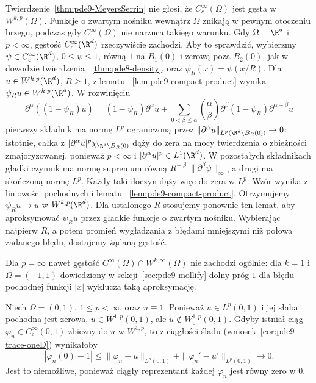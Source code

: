 \begin{uwaga}
Twierdzenie~\ref{thm:pde9-MeyersSerrin} nie głosi,
że $C_c^\infty(\Omega)$ jest gęsta w $W^{k,p}(\Omega)$.
Funkcje o zwartym nośniku wewnątrz $\Omega$
znikają w pewnym otoczeniu brzegu, podczas gdy
$C^\infty(\Omega)$ nie narzuca takiego warunku.
Gdy $\Omega=\R^d$ i $p<\infty$, gęstość
$C_c^\infty(\R^d)$ rzeczywiście zachodzi.
Aby to sprawdzić, wybierzmy $\psi\in C_c^\infty(\R^d)$,
$0\le\psi\le1$, równą $1$ na $B_1(0)$ i zerową
poza $B_2(0)$, jak w dowodzie twierdzenia
~\ref{thm:pde8-density}, oraz $\psi_R(x)=\psi(x/R)$.
Dla $u\in W^{k,p}(\R^d)$, $R\ge1$, z lematu
~\ref{lem:pde9-compact-product} wynika
$\psi_Ru\in W^{k,p}(\R^d)$.
W rozwinięciu
\[
 \partial^\alpha((1-\psi_R)u)=
 (1-\psi_R)\partial^\alpha u+
 \sum_{0<\beta\le\alpha}\binom{\alpha}{\beta}
 \partial^\beta(1-\psi_R)\partial^{\alpha-\beta}u
\]
pierwszy składnik ma normę $L^p$ ograniczoną przez
$\|\partial^\alpha u\|_{L^p(\R^d\setminus B_R(0))}\to0$:
istotnie, całka z
$|\partial^\alpha u|^p\chi_{\R^d\setminus B_R(0)}$
dąży do zera na mocy twierdzenia o zbieżności
zmajoryzowanej, ponieważ $p<\infty$ i
$|\partial^\alpha u|^p\in L^1(\R^d)$.
W pozostałych składnikach gładki czynnik ma normę
supremum równą
$R^{-|\beta|}\|\partial^\beta\psi\|_\infty$,
a drugi ma skończoną normę $L^p$.
Każdy taki iloczyn dąży więc do zera w $L^p$.
Wzór wynika z liniowości pochodnych i lematu
~\ref{lem:pde9-compact-product}.
Otrzymujemy $\psi_Ru\to u$ w $W^{k,p}(\R^d)$.
Dla ustalonego $R$ stosujemy ponownie ten lemat,
aby aproksymować $\psi_Ru$ przez gładkie funkcje
o zwartym nośniku. Wybierając najpierw $R$,
a potem promień wygładzania z błędami mniejszymi
niż połowa zadanego błędu, dostajemy żądaną gęstość.

Dla $p=\infty$ nawet gęstość
$C^\infty(\Omega)\cap W^{k,\infty}(\Omega)$
nie zachodzi ogólnie: dla $k=1$ i $\Omega=(-1,1)$
dowiedziony w sekcji~\ref{sec:pde9-mollify}
dolny próg $1$ dla błędu pochodnej funkcji $|x|$
wyklucza taką aproksymację.
\end{uwaga}

\begin{przyklad}
\label{ex:pde9-constant}
Niech $\Omega=(0,1)$, $1\le p<\infty$, oraz $u\equiv1$.
Ponieważ $u\in L^p(0,1)$ i jej słaba pochodna
jest zerowa, $u\in W^{1,p}(0,1)$, ale
$u\notin W^{1,p}_0(0,1)$. Gdyby istniał ciąg
$\varphi_n\in C_c^\infty(0,1)$ zbieżny do $u$
w $W^{1,p}$, to z ciągłości śladu
(wniosek~\ref{cor:pde9-trace-oneD}) wynikałoby
\[
 |\varphi_n(0)-1|\le
 \|\varphi_n-u\|_{L^p(0,1)}+
 \|\varphi_n'-u'\|_{L^p(0,1)}\longrightarrow0.
\]
Jest to niemożliwe, ponieważ ciągły reprezentant
każdej $\varphi_n$ jest równy zero w $0$.
\end{przyklad}

